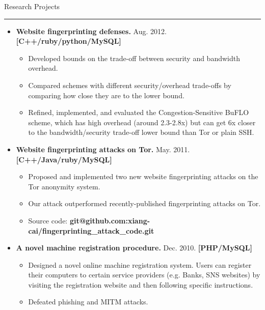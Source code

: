 \documentclass[11pt,oneside]{article}
\newenvironment{ressection}[1]{
	{\fontfamily{phv}\selectfont\Large#1}
	
	\vspace{-8pt} \rule{\textwidth}{.5pt}
	
	\vspace{-4pt}
	\begin{itemize}
	\vspace{.5pt}
}{
	\end{itemize}
}
\newcommand{\resitem}[1]{
	\vspace{2pt}
	\item \begin{flushleft} #1 \end{flushleft}
}
\begin{document}
\begin{ressection}{Research Projects}

	\resitem{\textbf{Website fingerprinting defenses.} Aug.
		2012. \hfill\textbf{[C++/ruby/python/MySQL]} 
		\vspace{-2pt}
		\begin{small}
		\vspace{-2pt}
		\begin{itemize}
		\item
		Developed bounds on the trade-off between security and
		bandwidth overhead.
		\item
		Compared schemes with different
		security/overhead trade-offs by comparing how close they are
		to the lower bound. 
		\item
		Refined, implemented, and evaluated
		the Congestion-Sensitive BuFLO scheme, which has high overhead (around 2.3-2.8x) but can
		get 6x closer to the bandwidth/security trade-off lower bound
		than Tor or plain SSH.
		\end{itemize}
		
		\end{small}				
	}
	\vspace{-4pt}
	\resitem{\textbf{Website fingerprinting attacks on Tor.} May.
		2011. \hfill\textbf{[C++/Java/ruby/MySQL]} 
		\vspace{-2pt}
		\begin{small}
		\vspace{-2pt}
		\begin{itemize}
		\item		
		Proposed and implemented two new website fingerprinting
			attacks on the Tor anonymity system.
		\item	
			Our attack outperformed recently-published fingerprinting attacks on Tor.
		\item			
			Source code: \textbf{git@github.com:xiang-cai/fingerprinting\_attack\_code.git}
		
		\end{itemize}		
		\end{small}				
	}

	\vspace{-4pt}
	\resitem{\textbf{A novel machine registration procedure.} Dec. 
		2010. \hfill\textbf{[PHP/MySQL]}
		\vspace{-2pt}
		\begin{small}
		\vspace{-2pt}
		\begin{itemize}
		\item
		Designed a novel online machine
			registration system. Users can register their computers to
			certain service providers (e.g. Banks, SNS websites) by
			visiting the registration website and then following specific
			instructions.
			\item
			Defeated phishing and MITM attacks.
		\end{itemize}
		\end{small}	
	}
			

\end{ressection}
\end{document}
